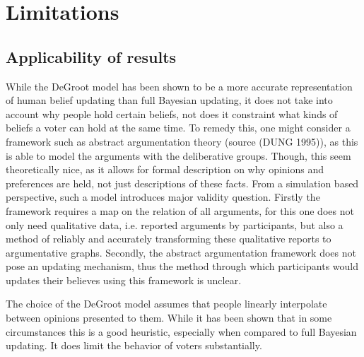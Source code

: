 


\section{Limitations}

\subsection{Applicability of results}

While the DeGroot model has been shown to be a more accurate representation of
human belief updating than full Bayesian updating, it does not take into
account why people hold certain beliefs, not does it constraint what kinds of
beliefs a voter can hold at the same time. To remedy this, one might consider a
framework such as abstract argumentation theory (source (DUNG 1995)), as this
is able to model the arguments with the deliberative groups. Though, this seem
theoretically nice, as it allows for formal description on why opinions and
preferences are held, not just descriptions of these facts. From a simulation
based perspective, such a model introduces major validity question. Firstly the
framework requires a map on the relation of all arguments, for this one does
not only need qualitative data, i.e. reported arguments by participants, but
also a method of reliably and accurately transforming these qualitative reports
to argumentative graphs. Secondly, the abstract argumentation framework does
not pose an updating mechanism, thus the method through which participants
would updates their believes using this framework is unclear.

The choice of the DeGroot model assumes that people linearly interpolate between
opinions presented to them. While it has been shown that in some circumstances 
this is a good heuristic, especially when compared to full Bayesian updating. It
does limit the behavior of voters substantially.  

